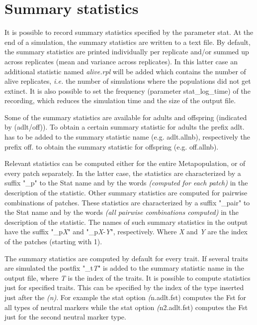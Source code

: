 \documentclass[letterpaper,12pt,oneside]{book}
\begin{document}
\section{Summary statistics}\label{sec:SummaryStatistics}
It is possible to record summary statistics specified by the parameter \textsf{stat}. At the end of a simulation, the summary statistics are written to a text file. By default, the summary statistics are printed individually per replicate and/or summed up across replicates (mean and variance across replicates). In this latter case an additional statistic named \textit{alive.rpl} will be added which contains the number of alive replicates, \textit{i.e.} the number of simulations where the populations did not get extinct. It is also possible to set the frequency (parameter \textsf{stat\_log\_time}) of the recording, which reduces the simulation time and the size of the output file. 


Some of the summary statistics are available for adults and offspring (indicated by \textsf{(adlt/off)}). To obtain a certain summary statistic for adults the prefix \textsf{adlt.} has to be added to the summary statistic name (e.g. \textsf{adlt.allnb}), respectively the prefix \textsf{off.} to obtain the summary statistic for offspring (e.g. \textsf{off.allnb}). 

Relevant statistics can be computed either for the entire Metapopulation, or of every patch separately. In the latter case, the statistics are characterized by a suffix "\_p" to the \textsf{Stat name} and by the words \textit{(computed for each patch)} in the description of the statistic. Other summary statistics are computed for pairwise combinations of patches. These statistics are characterized by a suffix "\_pair" to the \textsf{Stat name} and by the words \textit{(all pairwise combinations computed)} in the description of the statistic. The names of such summary statistics in the output have the suffix "\_p\textit{X}" and "\_p\textit{X}-\textit{Y}", respectively. Where \textit{X} and \textit{Y} are the index of the patches (starting with 1). 

The summary statistics are computed by default for every trait. If several traits are simulated the postfix "\_t\textit{T}" is added to the summary statistic name in the output file, where \textit{T} is the index of the traits. It is possible to compute statistics just for specified traits. This can be specified by the index of the type inserted just after the \textit{(n)}. For example the stat option \textit(n.adlt.fst) computes the Fst for all types of neutral markers while the stat option \textit(n2.adlt.fst) computes the Fst just for the second neutral marker type. 
\end{document}
